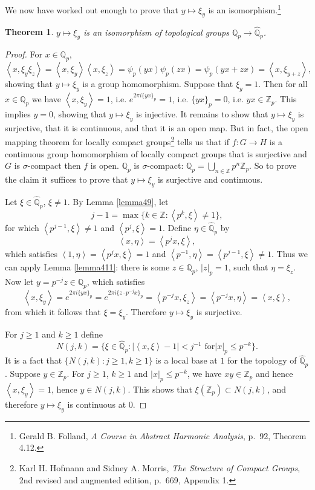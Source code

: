 \documentclass{article}
\newcommand{\inner}[2]{\left\langle #1, #2 \right\rangle}
\newtheorem{theorem}{Theorem}
\theoremstyle{definition}
\begin{document}
We now have worked out enough to prove that
$y \mapsto \xi_y$ is an isomorphism.\footnote{Gerald B. Folland, {\em A Course in Abstract Harmonic
Analysis}, p.~92, Theorem 4.12.}

\begin{theorem}
$y \mapsto \xi_y$ is an isomorphism of topological groups $\mathbb{Q}_p \to \widehat{\mathbb{Q}}_p$. 
\end{theorem}
\begin{proof}
For $x \in \mathbb{Q}_p$,
\[
\inner{x}{\xi_y \xi_z} = \inner{x}{\xi_y} \inner{x}{\xi_z} = \psi_p(yx) \psi_p(zx) = \psi_p(yx+zx)=
\inner{x}{\xi_{y+z}},
\]
showing that $y \mapsto \xi_y$ is a group homomorphism. Suppose that $\xi_y=1$. Then for all
$x \in \mathbb{Q}_p$ we have $\inner{x}{\xi_y}=1$, i.e. $e^{2\pi i\{yx\}_p}=1$, i.e.
$\{yx\}_p = 0$, i.e. $yx \in \mathbb{Z}_p$. 
This implies $y=0$, showing that $y \mapsto \xi_y$ is injective.
It remains to show that $y \mapsto \xi_y$ is surjective, that it is continuous, and that it is an open map. But in
fact, the open mapping theorem for locally compact groups\footnote{Karl H. Hofmann and Sidney A. Morris,
{\em The Structure of Compact Groups}, 2nd revised and augmented edition,
p.~669, Appendix 1.} tells us that
if $f:G \to H$ is a continuous group homomorphism of locally compact groups that is surjective and $G$ is $\sigma$-compact then
$f$ is open. $\mathbb{Q}_p$ is $\sigma$-compact: $\mathbb{Q}_p = \bigcup_{n \in \mathbb{Z}} p^n \mathbb{Z}_p$. So to prove
the claim it suffices to prove that $y \mapsto \xi_y$ is surjective and continuous.


Let $\xi \in \widehat{\mathbb{Q}}_p$, $\xi \neq 1$. By Lemma \ref{lemma49}, 
let
\[
j - 1 = \max\{k \in \mathbb{Z} : \inner{p^{k}}{\xi} \neq 1\},
\]
for which $\inner{p^{j-1}}{\xi} \neq 1$ and $\inner{p^j}{\xi}=1$.
Define $\eta \in \widehat{\mathbb{Q}}_p$ by
\[
\inner{x}{\eta} = \inner{p^jx}{\xi},
\] 
which satisfies $\inner{1}{\eta} = \inner{p^jx}{\xi} = 1$ and
$\inner{p^{-1}}{\eta} = \inner{p^{j-1}}{\xi} \neq 1$. Thus we can apply Lemma \ref{lemma411}:
there is some $z \in \mathbb{Q}_p$, $|z|_p=1$,  such that $\eta=\xi_z$. 
Now let $y=p^{-j}z \in \mathbb{Q}_p$, which satisfies
\[
\inner{x}{\xi_y} = e^{2\pi i\{yx\}_p} = e^{2\pi i \{z\cdot p^{-j}x\}_p} =
\inner{p^{-j}x}{\xi_z} 
=\inner{p^{-j}x}{\eta}
=\inner{x}{\xi},
\]
from which it follows that $\xi=\xi_y$. Therefore $y \mapsto \xi_y$ is surjective. 

For $j \geq 1$ and $k \geq 1$ define
\[
N(j,k) = \{\xi \in \widehat{\mathbb{Q}}_p : \textrm{$|\inner{x}{\xi}-1| < j^{-1}$ for
$|x|_p \leq p^{-k}$}\}.
\]
It is a fact that $\{N(j,k): j \geq 1, k \geq 1\}$ is a local base at $1$ for the topology of $\widehat{\mathbb{Q}}_p$. 
Suppose $y \in \mathbb{Z}_p$. For $j \geq 1$,
$k \geq 1$ and $|x|_p \leq p^{-k}$, we have $xy \in \mathbb{Z}_p$ and hence
$\inner{x}{\xi_y}=1$, hence $y \in N(j,k)$.  This shows that $\xi(\mathbb{Z}_p) \subset N(j,k)$, and therefore
$y \mapsto \xi_y$ is continuous at $0$. 
\end{proof}
\end{document}

